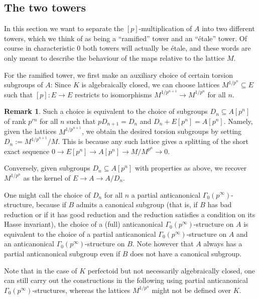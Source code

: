 \documentclass[10pt,oneside]{amsart}
\theoremstyle{definition}
\newtheorem{remark}[theorem]{Remark}
\begin{document}
	\subsection{The two towers}
	In this section we want to separate the $[p]$-multiplication of $A$ into two different towers, which we think of as being a ``ramified'' tower and an ``\'etale'' tower. Of course in characteristic $0$ both towers will actually be \'etale, and these words are only meant to describe the behaviour of the maps relative to the lattice $M$.
	
	For the ramified tower, we first make an auxiliary choice of certain torsion subgroups of $A$: Since $K$ is algebraically closed, we can choose lattices $M^{1/p^n}\subseteq E$ such that $[p]:E\rightarrow E$ restricts to isomorphisms $M^{1/p^{n+1}}\rightarrow M^{1/p^n}$ for all $n$.
	
	\begin{remark}\label{remark: Definition of the D_n}
		Such a choice is equivalent to the choice of subgroups $D_n\subseteq A[p^n]$ of rank $p^{rn}$ for all $n$ such that $pD_{n+1}=D_n$ and $D_n+E[p^n]=A[p^n]$. Namely,
		given the lattices $M^{1/p^{n+1}}$, we obtain the desired torsion subgroups by setting $D_n:=M^{1/p^{n+1}}/M$. This is because any such lattice gives a splitting of the short exact sequence $0\rightarrow E[p^n]\rightarrow A[p^n]\rightarrow M/M^{p^n} \rightarrow 0$.
		
		Conversely, given subgroups $D_n\subseteq A[p^n]$ with properties as above, we recover $M^{1/p^n}$ as the kernel of $E\rightarrow A\rightarrow A/D_n$.
		
		One might call the choice of $D_n$ for all $n$ a partial anticanonical $\Gamma_0(p^\infty)$-structure, because if $B$ admits a canonical subgroup (that is, if $B$ has bad reduction or if it has good reduction and the reduction satisfies a condition on its Hasse invariant), the choice of a (full) anticanonical $\Gamma_0(p^\infty)$-structure on $A$ is equivalent to the choice of a partial anticanonical $\Gamma_0(p^\infty)$-structure on $A$ and an anticanonical $\Gamma_0(p^\infty)$-structure on $B$. Note however that $A$ always has a partial anticanonical subgroup even if $B$ does not have a canonical subgroup.
		
		Note that in the case of $K$ perfectoid but not necessarily algebraically closed, one can still carry out the constructions in the following using partial anticanonical $\Gamma_0(p^\infty)$-structures, whereas the lattices $M^{1/p^n}$ might not be defined over $K$.
	\end{remark}
	
\end{document}
